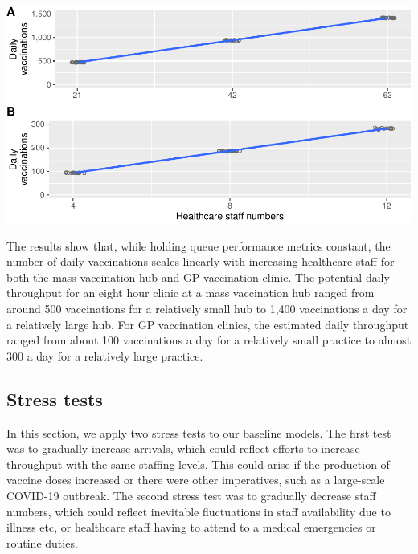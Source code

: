 \documentclass{article}
\let\origfigure\figure
\let\endorigfigure\endfigure
\renewenvironment{figure}[1][2] {
    \expandafter\origfigure\expandafter[H]
} {
    \endorigfigure
}
\begin{document}
\begin{figure}

{\centering \includegraphics{Preprint_files/figure-latex/baselineThroughput-1} 

}

\caption{Baseline daily throughput for mass vaccination hubs (A) and GP vaccination clinics (B)}\label{fig:baselineThroughput}
\end{figure}

The results show that, while holding queue performance metrics constant,
the number of daily vaccinations scales linearly with increasing
healthcare staff for both the mass vaccination hub and GP vaccination
clinic. The potential daily throughput for an eight hour clinic at a
mass vaccination hub ranged from around 500 vaccinations for a
relatively small hub to 1,400 vaccinations a day for a relatively large
hub. For GP vaccination clinics, the estimated daily throughput ranged
from about 100 vaccinations a day for a relatively small practice to
almost 300 a day for a relatively large practice.

\hypertarget{stress-tests}{%
\subsection{Stress tests}\label{stress-tests}}

In this section, we apply two stress tests to our baseline models. The
first test was to gradually increase arrivals, which could reflect
efforts to increase throughput with the same staffing levels. This could
arise if the production of vaccine doses increased or there were other
imperatives, such as a large-scale COVID-19 outbreak. The second stress
test was to gradually decrease staff numbers, which could reflect
inevitable fluctuations in staff availability due to illness etc, or
healthcare staff having to attend to a medical emergencies or routine
duties.
\end{document}
